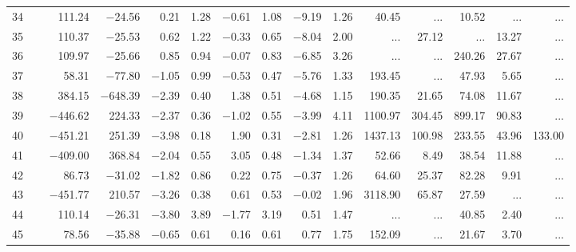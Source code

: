 \begin{table*}[p]
{\begin{tabular}{l@{ }r@{ \ }rr@{ \ }rr@{ \ }rrrr@{ \ }r@{ \ }r@{ \ }r@{ \ }r}
 34   \ \dotfill \  &    111.24 &   $-$24.56 &    0.21 &   1.28 &  $-$0.61 &   1.08&  $-$9.19 &   1.26&       40.45 &    ...     &       10.52 &    ...     &    ...       \\     
 35   \ \dotfill \  &    110.37 &   $-$25.53 &    0.62 &   1.22 &  $-$0.33 &   0.65&  $-$8.04 &   2.00&    ...     &       27.12 &    ...     &       13.27 &    ...       \\     
 36   \ \dotfill \  &    109.97 &   $-$25.66 &    0.85 &   0.94 &  $-$0.07 &   0.83&  $-$6.85 &   3.26&    ...     &    ...     &      240.26 &       27.67 &    ...       \\     
 37   \ \dotfill \  &     58.31 &   $-$77.80 &  $-$1.05 &   0.99 &  $-$0.53 &   0.47&  $-$5.76 &   1.33&      193.45 &    ...     &       47.93 &        5.65 &    ...       \\     
 38   \ \dotfill \  &    384.15 &  $-$648.39 &  $-$2.39 &   0.40 &    1.38 &   0.51&  $-$4.68 &   1.15&      190.35 &       21.65 &       74.08 &       11.67 &    ...       \\     
 39   \ \dotfill \  &  $-$446.62 &    224.33 &  $-$2.37 &   0.36 &  $-$1.02 &   0.55&  $-$3.99 &   4.11&     1100.97 &      304.45 &      899.17 &       90.83 &    ...       \\     
 40   \ \dotfill \  &  $-$451.21 &    251.39 &  $-$3.98 &   0.18 &    1.90 &   0.31&  $-$2.81 &   1.26&     1437.13 &      100.98 &      233.55 &       43.96 &      133.00   \\     
 41   \ \dotfill \  &  $-$409.00 &    368.84 &  $-$2.04 &   0.55 &    3.05 &   0.48&  $-$1.34 &   1.37&       52.66 &        8.49 &       38.54 &       11.88 &    ...       \\     
 42   \ \dotfill \  &     86.73 &   $-$31.02 &  $-$1.82 &   0.86 &    0.22 &   0.75&  $-$0.37 &   1.26&       64.60 &       25.37 &       82.28 &        9.91 &    ...       \\     
 43   \ \dotfill \  &  $-$451.77 &    210.57 &  $-$3.26 &   0.38 &    0.61 &   0.53&  $-$0.02 &   1.96&     3118.90 &       65.87 &       27.59 &    ...     &    ...       \\     
 44   \ \dotfill \  &    110.14 &   $-$26.31 &  $-$3.80 &   3.89 &  $-$1.77 &   3.19&    0.51 &   1.47&    ...     &    ...     &       40.85 &        2.40 &    ...       \\     
 45   \ \dotfill \  &     78.56 &   $-$35.88 &  $-$0.65 &   0.61 &    0.16 &   0.61&    0.77 &   1.75&      152.09 &    ...     &       21.67 &        3.70 &    ...       \\     

\end{tabular}}
\end{table*}
